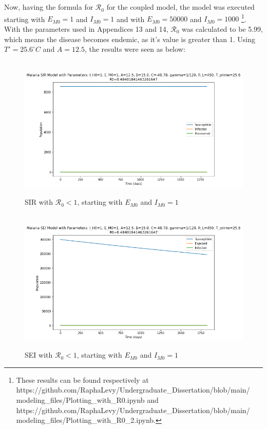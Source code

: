 \\\\
Now, having the formula for $\mathcal{R}_0$ for the coupled model,
the model was executed starting with $E_{M0}=1$ and $I_{M0}=1$ and with
$E_{M0}=50000$ and $I_{M0}=1000$
\footnote{These results can be found respectively at
https://github.com/RaphaLevy/Undergraduate\_Dissertation/blob/main/
\\modeling\_files/Plotting\_with\_R0.ipynb and
https://github.com/RaphaLevy/Undergraduate\_Dissertation/blob/main/
\\modeling\_files/Plotting\_with\_R0\_2.ipynb.}. With the parameters used
in Appendices 13 and 14, $\mathcal{R}_0$ was calculated to be 5.99, which
means the disease becomes endemic, as it's value is greater than 1. Using $T'=25.6^{\circ}C$
and $A=12.5$, the results were seen as below:
\newpage
\begin{figure}[!ht]
        \centering
        \hbox{\hspace{2.8em} \includegraphics[scale=0.5] {THESIS-SIR_Initial_EI_1_R0_leq_1.png}}
        \caption{SIR with $\mathcal{R}_0 <1$, starting with $E_{M0}$ and $I_{M0}=1$}
\end{figure} 
\begin{figure}[!ht]
        \centering
        \hbox{\hspace{2.8em} \includegraphics[scale=0.5] {THESIS-SEI_Initial_EI_1_R0_leq_1.png}}
        \caption{SEI with $\mathcal{R}_0 <1$, starting with $E_{M0}$ and $I_{M0}=1$}
\end{figure}

